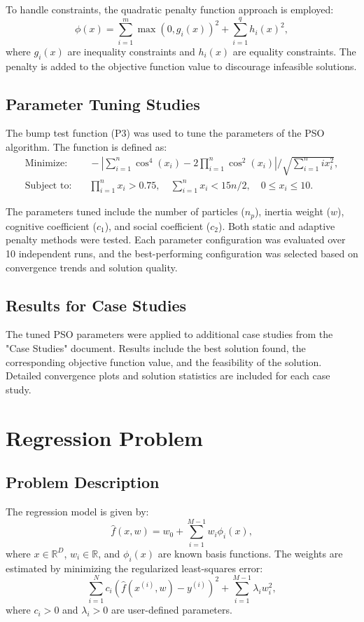 \documentclass[12pt]{article}
\begin{document}
To handle constraints, the quadratic penalty function approach is employed:
\begin{equation*}
    \phi(x) = \sum_{i=1}^{m} \max(0, g_i(x))^2 + \sum_{i=1}^{q} h_i(x)^2,
\end{equation*}
where $g_i(x)$ are inequality constraints and $h_i(x)$ are equality constraints. The penalty is added to the objective function value to discourage infeasible solutions.

\subsection{Parameter Tuning Studies}
The bump test function (P3) was used to tune the parameters of the PSO algorithm. The function is defined as:
\begin{align*}
    \text{Minimize:} & \quad -\left|\sum_{i=1}^{n} \cos^4(x_i) - 2 \prod_{i=1}^{n} \cos^2(x_i) \right| \Big/ \sqrt{\sum_{i=1}^{n} i x_i^2}, \\
    \text{Subject to:} & \quad \prod_{i=1}^{n} x_i > 0.75, \quad \sum_{i=1}^{n} x_i < 15n/2, \quad 0 \leq x_i \leq 10.
\end{align*}

The parameters tuned include the number of particles ($n_p$), inertia weight ($w$), cognitive coefficient ($c_1$), and social coefficient ($c_2$). Both static and adaptive penalty methods were tested. Each parameter configuration was evaluated over 10 independent runs, and the best-performing configuration was selected based on convergence trends and solution quality.

\subsection{Results for Case Studies}
The tuned PSO parameters were applied to additional case studies from the "Case Studies" document. Results include the best solution found, the corresponding objective function value, and the feasibility of the solution. Detailed convergence plots and solution statistics are included for each case study.

\section{Regression Problem}

\subsection{Problem Description}
The regression model is given by:
\begin{equation*}
    \hat{f}(x, w) = w_0 + \sum_{i=1}^{M-1} w_i \phi_i(x),
\end{equation*}
where $x \in \mathbb{R}^D$, $w_i \in \mathbb{R}$, and $\phi_i(x)$ are known basis functions. The weights are estimated by minimizing the regularized least-squares error:
\begin{equation*}
    \sum_{i=1}^{N} c_i (\hat{f}(x^{(i)}, w) - y^{(i)})^2 + \sum_{i=1}^{M-1} \lambda_i w_i^2,
\end{equation*}
where $c_i > 0$ and $\lambda_i > 0$ are user-defined parameters.
\end{document}

